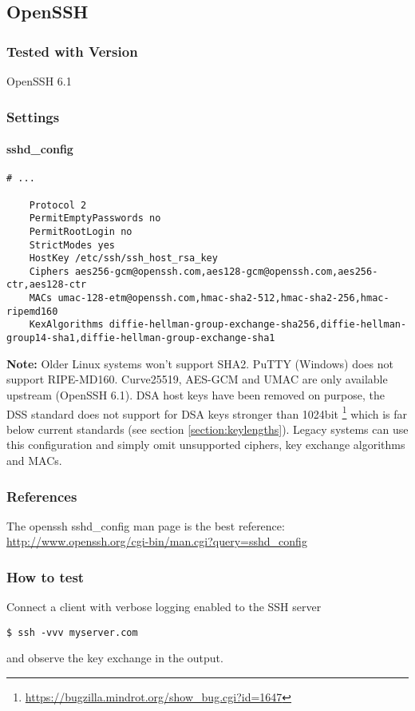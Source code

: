\subsection{OpenSSH}
\subsubsection{Tested with Version} OpenSSH 6.1
\subsubsection{Settings}
\paragraph*{sshd\_config}
\begin{lstlisting}[breaklines]
	# ...

	Protocol 2
	PermitEmptyPasswords no
	PermitRootLogin no
	StrictModes yes
	HostKey /etc/ssh/ssh_host_rsa_key
	Ciphers aes256-gcm@openssh.com,aes128-gcm@openssh.com,aes256-ctr,aes128-ctr
	MACs umac-128-etm@openssh.com,hmac-sha2-512,hmac-sha2-256,hmac-ripemd160
	KexAlgorithms diffie-hellman-group-exchange-sha256,diffie-hellman-group14-sha1,diffie-hellman-group-exchange-sha1
\end{lstlisting}

\textbf{Note:} Older Linux systems won't support SHA2. PuTTY (Windows) does not support
RIPE-MD160. Curve25519, AES-GCM and UMAC are only available upstream (OpenSSH
6.1). DSA host keys have been removed on purpose, the DSS standard does not
support for DSA keys stronger than 1024bit
\footnote{\url{https://bugzilla.mindrot.org/show_bug.cgi?id=1647}} which is far
below current standards (see section \ref{section:keylengths}). Legacy systems
can use this configuration and simply omit unsupported ciphers, key exchange
algorithms and MACs.  
\subsubsection{References}
The openssh sshd\_config  man page is the best reference: \url{http://www.openssh.org/cgi-bin/man.cgi?query=sshd_config}
\subsubsection{How to test}
Connect a client with verbose logging enabled to the SSH server \\
\begin{lstlisting}[breaklines]
$ ssh -vvv myserver.com
\end{lstlisting}and observe the key exchange in the output.


